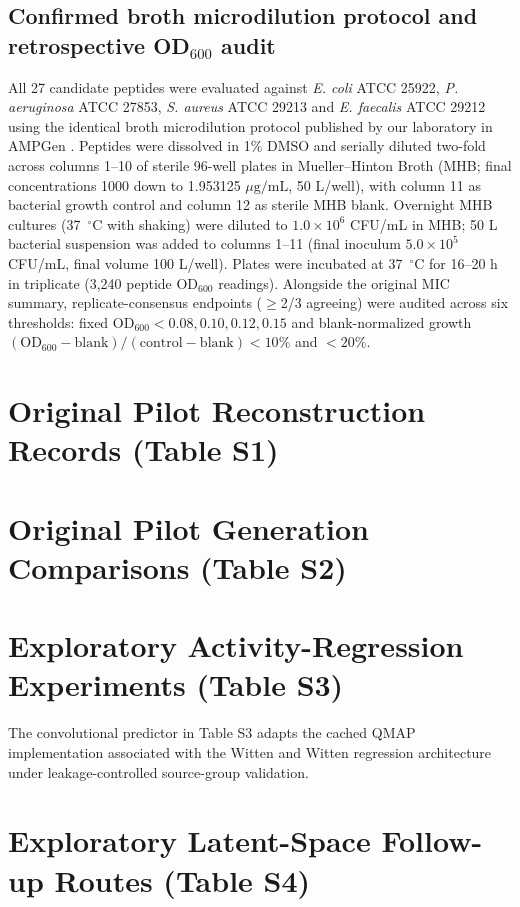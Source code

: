 \documentclass[11pt,a4paper]{article}
\newcommand{\ug}{\ensuremath{\mu\mathrm{g}/\mathrm{mL}}}
\newcommand{\rev}[1]{#1}
\begin{document}
\subsection*{Confirmed broth microdilution protocol and retrospective OD$_{600}$ audit}
\rev{All 27 candidate peptides were evaluated against \textit{E. coli} ATCC 25922, \textit{P. aeruginosa} ATCC 27853, \textit{S. aureus} ATCC 29213 and \textit{E. faecalis} ATCC 29212 using the identical broth microdilution protocol published by our laboratory in AMPGen \cite{ref9}. Peptides were dissolved in 1\% DMSO and serially diluted two-fold across columns 1--10 of sterile 96-well plates in Mueller--Hinton Broth (MHB; final concentrations 1000 down to 1.953125 \ug, 50 \textmu{}L/well), with column 11 as bacterial growth control and column 12 as sterile MHB blank. Overnight MHB cultures (37~$^\circ$C with shaking) were diluted to $1.0\times 10^6$ CFU/mL in MHB; 50 \textmu{}L bacterial suspension was added to columns 1--11 (final inoculum $5.0\times 10^5$ CFU/mL, final volume 100 \textmu{}L/well). Plates were incubated at 37~$^\circ$C for 16--20 h in triplicate (3,240 peptide OD$_{600}$ readings). Alongside the original MIC summary, replicate-consensus endpoints ($\geq$2/3 agreeing) were audited across six thresholds: fixed OD$_{600}<0.08, 0.10, 0.12, 0.15$ and blank-normalized growth $(\mathrm{OD}_{600}-\mathrm{blank})/(\mathrm{control}-\mathrm{blank})<10\%$ and $<20\%$.}

\section{Original Pilot Reconstruction Records (Table S1)}


\section{Original Pilot Generation Comparisons (Table S2)}


\section{Exploratory Activity-Regression Experiments (Table S3)}
The convolutional predictor in Table S3 adapts the cached QMAP implementation \cite{ref13} associated with the Witten and Witten regression architecture \cite{ref12} under leakage-controlled source-group validation.


\section{Exploratory Latent-Space Follow-up Routes (Table S4)}

\end{document}

